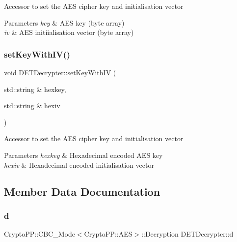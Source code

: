 Accessor to set the A\+ES cipher key and initialisation vector 
\begin{DoxyParams}{Parameters}
{\em key} & A\+ES key (byte array) \\
\hline
{\em iv} & A\+ES initiialisation vector (byte array) \\
\hline
\end{DoxyParams}
\mbox{\label{classDETDecrypter_aea297de1f5c514a5156eabc22c556b3b}} 
\subsubsection{\texorpdfstring{set\+Key\+With\+I\+V()}{setKeyWithIV()}\hspace{0.1cm}{\footnotesize\ttfamily [2/2]}}
{\footnotesize\ttfamily void D\+E\+T\+Decrypter\+::set\+Key\+With\+IV (\begin{DoxyParamCaption}\item[{std\+::string \&}]{hexkey,  }\item[{std\+::string \&}]{hexiv }\end{DoxyParamCaption})}

Accessor to set the A\+ES cipher key and initialisation vector 
\begin{DoxyParams}{Parameters}
{\em hexkey} & Hexadecimal encoded A\+ES key \\
\hline
{\em hexiv} & Hexadecimal encoded initialisation vector \\
\hline
\end{DoxyParams}


\subsection{Member Data Documentation}
\mbox{\label{classDETDecrypter_ab598e2e972f3052d372f37d39aae07cf}} 
\subsubsection{\texorpdfstring{d}{d}}
{\footnotesize\ttfamily Crypto\+P\+P\+::\+C\+B\+C\+\_\+\+Mode$<$Crypto\+P\+P\+::\+A\+ES$>$\+::Decryption D\+E\+T\+Decrypter\+::d\hspace{0.3cm}{\ttfamily [private]}}

